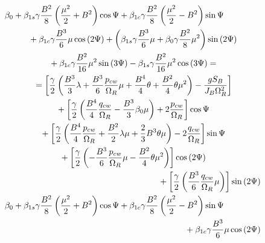 \begin{gather}
  \label{eq-aero-flapping-coefs-ccw-3}
  \begin{multlined}[0.88\textwidth]
    \beta_0
    + 
    \beta_{1s} \gamma \frac{B^2}{8}
    \left( \frac{\mu^2}{2} + B^2 \right) \cos \Psi
    +
    \beta_{1c} \gamma \frac{B^2}{8}
    \left( \frac{\mu^2}{2} - B^2 \right) \sin \Psi
    \\
    +
    \beta_{1c} \gamma \frac{B^3}{6} \mu \cos \left( 2 \Psi \right)
    +
    \left(
        \beta_{1s} \gamma \frac{B^3}{6} \mu
      + \beta_0 \gamma \frac{B^2}{8} \mu^2
    \right) \sin \left( 2 \Psi \right)
    \\
    +
    \beta_{1c} \gamma \frac{B^2}{16} \mu^2 \sin \left( 3 \Psi \right)
    -
    \beta_{1s} \gamma \frac{B^2}{16} \mu^2 \cos \left( 3 \Psi \right)
    = \\ =
    \left[
      \frac{\gamma}{2}
      \left(
          \frac{B^3}{3} \lambda
        + \frac{B^3}{6} \frac{p_{cw}}{\Omega_R} \mu
        + \frac{B^4}{4} \theta
        + \frac{B^2}{4} \theta \mu^2
      \right) - \frac{ g S_B }{ J_B \Omega_R^2 }
    \right]
    \\
    + \left[
      \frac{\gamma}{2}
      \left(
          \frac{B^4}{4} \frac{q_{cw}}{\Omega_R}
        - \frac{B^3}{3} \beta_0 \mu
      \right) + 2 \frac{p_{cw}}{\Omega_R}
    \right] \cos \Psi
    \\
    + \left[
      \frac{\gamma}{2}
      \left(
          \frac{B^4}{4} \frac{p_{cw}}{\Omega_R}
        + \frac{B^2}{2} \lambda \mu
        + \frac{2}{3} B^3 \theta \mu
        \right) - 2 \frac{q_{cw}}{\Omega_R}
    \right] \sin \Psi
    \\
    + \left[
      \frac{\gamma}{2}
      \left(
        - \frac{B^3}{6} \frac{p_{cw}}{\Omega_R} \mu
        - \frac{B^2}{4} \theta \mu^2
      \right)
    \right] \cos \left( 2 \Psi \right)
    \\
    + \left[
      \frac{\gamma}{2}
      \left( \frac{B^3}{6} \frac{q_{cw}}{\Omega_R} \mu \right)
    \right] \sin \left( 2 \Psi \right)
  \end{multlined}
  \\
  \label{eq-aero-flapping-coefs-cw-3}
  \begin{multlined}[0.88\textwidth]
    \beta_0
    + 
    \beta_{1s} \gamma \frac{B^2}{8}
    \left( \frac{\mu^2}{2} + B^2 \right) \cos \Psi
    +
    \beta_{1c} \gamma \frac{B^2}{8}
    \left( \frac{\mu^2}{2} - B^2 \right) \sin \Psi
    \\
    +
    \beta_{1c} \gamma \frac{B^3}{6} \mu \cos \left( 2 \Psi \right)

\end{multlined}
\end{gather}
